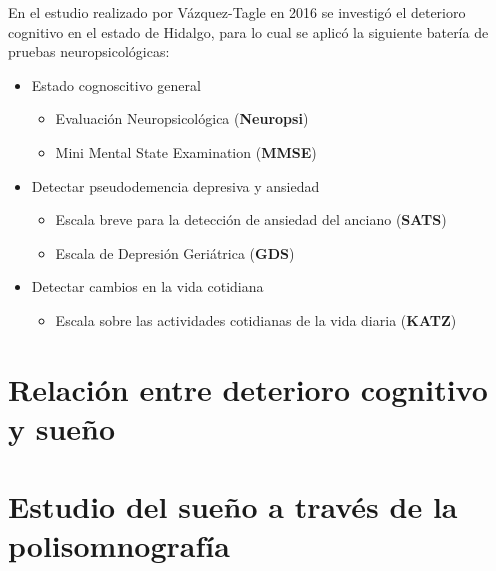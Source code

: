 En el estudio realizado por Vázquez-Tagle en 2016 \cite{VazquezTagle16} se investigó el deterioro
cognitivo en el estado de Hidalgo, para lo cual se aplicó la siguiente batería de pruebas
neuropsicológicas:
\begin{itemize}
\item Estado cognoscitivo general
\begin{itemize}
\item {Evaluación Neuropsicológica (\textbf{Neuropsi})} \cite{Solis03}
\item {Mini Mental State Examination (\textbf{MMSE})} \cite{Velasco15}
\end{itemize}
\item Detectar pseudodemencia depresiva y ansiedad
\begin{itemize}
\item {Escala breve para la detección de ansiedad del anciano (\textbf{SATS})} \cite{Vargas11}
\item {Escala de Depresión Geriátrica (\textbf{GDS})} \cite{Yesavage82}
\end{itemize}
\item Detectar cambios en la vida cotidiana
\begin{itemize}
\item {Escala sobre las actividades cotidianas de la vida diaria (\textbf{KATZ})} \cite{Roumec14}
\end{itemize}
\end{itemize}


\section{Relación entre deterioro cognitivo y sueño}




\section{Estudio del sueño a través de la polisomnografía}

